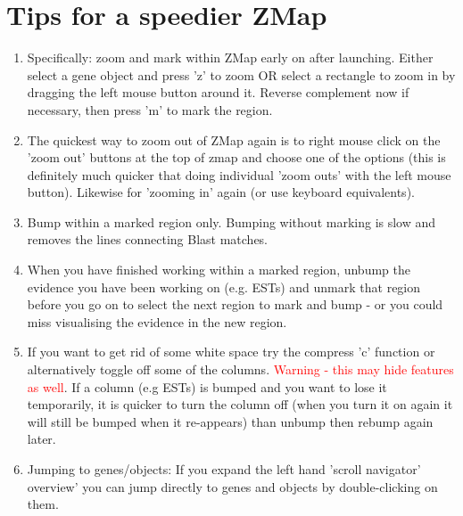 \documentclass[letterpaper]{article}
\begin{document}
\section{Tips for a speedier ZMap}
\begin{enumerate}
\item Specifically: zoom and mark within ZMap early on after launching. Either select a gene object and press 'z' to zoom OR select a rectangle to zoom in by dragging the left mouse button around it. Reverse complement now if necessary, then press 'm' to mark the region.
\item The quickest way to zoom out of ZMap again is to right mouse click on the 'zoom out' buttons at the top of zmap and choose one of the options (this is definitely much quicker that doing individual 'zoom outs' with the left mouse button). Likewise for 'zooming in' again (or use keyboard equivalents).
\item Bump within a marked region only. Bumping without marking is slow and removes the lines connecting Blast matches.
\item When you have finished working within a marked region, unbump the evidence you have been working on (e.g. ESTs) and unmark that region before you go on to select the next region to mark and bump - or you could miss visualising the evidence in the new region.
\item If you want to get rid of some white space try the compress 'c' function or alternatively toggle off some of the columns. \textcolor{red}{Warning - this may hide features as well}. If a column (e.g ESTs) is bumped and you want to lose it temporarily, it is quicker to turn the column off (when you turn it on again it will still be bumped when it re-appears) than unbump then rebump again later.
\item Jumping to genes/objects: If you expand the left hand 'scroll navigator' overview' you can jump directly to genes and objects by double-clicking on them.
\end{enumerate}
\end{document}
